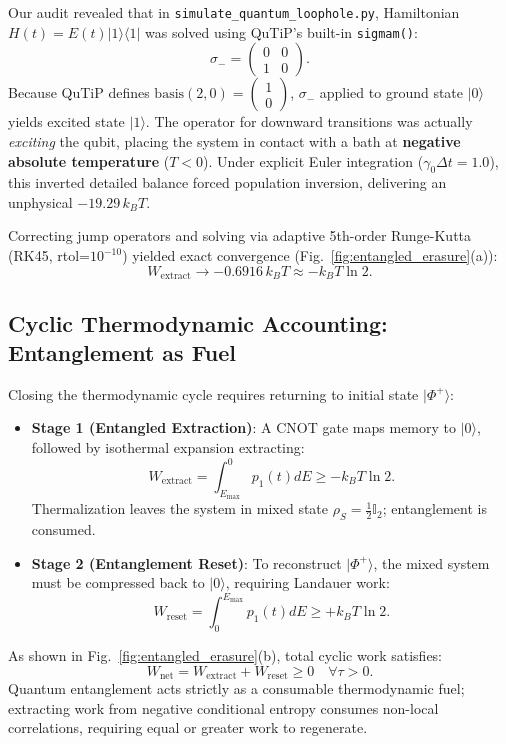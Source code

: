 \documentclass[10pt,twocolumn,a4paper]{article}
\begin{document}
Our audit revealed that in \texttt{simulate\_quantum\_loophole.py}, Hamiltonian $H(t) = E(t) |1\rangle\langle 1|$ was solved using QuTiP's built-in \texttt{sigmam()}:
\begin{equation}
\sigma_- = \begin{pmatrix} 0 & 0 \\ 1 & 0 \end{pmatrix}.
\end{equation}
Because QuTiP defines $\mathrm{basis}(2, 0) = \begin{pmatrix} 1 \\ 0 \end{pmatrix}$, $\sigma_-$ applied to ground state $|0\rangle$ yields excited state $|1\rangle$. The operator for downward transitions was actually \textit{exciting} the qubit, placing the system in contact with a bath at \textbf{negative absolute temperature} ($T < 0$). Under explicit Euler integration ($\gamma_0 \Delta t = 1.0$), this inverted detailed balance forced population inversion, delivering an unphysical $-19.29\,k_BT$.

Correcting jump operators and solving via adaptive 5th-order Runge-Kutta (RK45, rtol=$10^{-10}$) yielded exact convergence (Fig.~\ref{fig:entangled_erasure}(a)):
\begin{equation}
W_{\mathrm{extract}} \to -0.6916\,k_B T \approx -k_B T \ln 2.
\end{equation}

\subsection{Cyclic Thermodynamic Accounting: Entanglement as Fuel}
Closing the thermodynamic cycle requires returning to initial state $|\Phi^+\rangle$:
\begin{itemize}
    \item \textbf{Stage 1 (Entangled Extraction)}: A CNOT gate maps memory to $|0\rangle$, followed by isothermal expansion extracting:
    \begin{equation}
    W_{\mathrm{extract}} = \int_{E_{\mathrm{max}}}^0 p_1(t) dE \ge -k_B T \ln 2.
    \end{equation}
    Thermalization leaves the system in mixed state $\rho_S = \frac{1}{2}\mathbb{I}_2$; entanglement is consumed.
    \item \textbf{Stage 2 (Entanglement Reset)}: To reconstruct $|\Phi^+\rangle$, the mixed system must be compressed back to $|0\rangle$, requiring Landauer work:
    \begin{equation}
    W_{\mathrm{reset}} = \int_0^{E_{\mathrm{max}}} p_1(t) dE \ge +k_B T \ln 2.
    \end{equation}
\end{itemize}
As shown in Fig.~\ref{fig:entangled_erasure}(b), total cyclic work satisfies:
\begin{equation}
W_{\mathrm{net}} = W_{\mathrm{extract}} + W_{\mathrm{reset}} \ge 0 \quad \forall \tau > 0.
\end{equation}
Quantum entanglement acts strictly as a consumable thermodynamic fuel; extracting work from negative conditional entropy consumes non-local correlations, requiring equal or greater work to regenerate.
\end{document}
